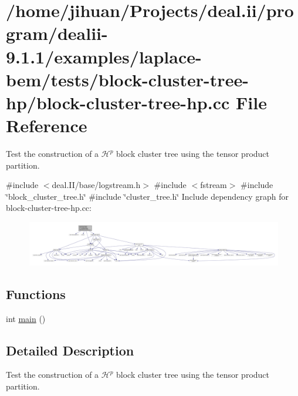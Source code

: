 \hypertarget{block-cluster-tree-hp_8cc}{}\section{/home/jihuan/\+Projects/deal.ii/program/dealii-\/9.1.1/examples/laplace-\/bem/tests/block-\/cluster-\/tree-\/hp/block-\/cluster-\/tree-\/hp.cc File Reference}
\label{block-cluster-tree-hp_8cc}


Test the construction of a $\mathcal{H}^p$ block cluster tree using the tensor product partition.  


{\ttfamily \#include $<$deal.\+I\+I/base/logstream.\+h$>$}\newline
{\ttfamily \#include $<$fstream$>$}\newline
{\ttfamily \#include \char`\"{}block\+\_\+cluster\+\_\+tree.\+h\char`\"{}}\newline
{\ttfamily \#include \char`\"{}cluster\+\_\+tree.\+h\char`\"{}}\newline
Include dependency graph for block-\/cluster-\/tree-\/hp.cc\+:
\nopagebreak
\begin{figure}[H]
\begin{center}
\leavevmode
\includegraphics[width=350pt]{block-cluster-tree-hp_8cc__incl}
\end{center}
\end{figure}
\subsection*{Functions}
\begin{DoxyCompactItemize}
\item 
int \hyperlink{block-cluster-tree-hp_8cc_ae66f6b31b5ad750f1fe042a706a4e3d4}{main} ()
\end{DoxyCompactItemize}


\subsection{Detailed Description}
Test the construction of a $\mathcal{H}^p$ block cluster tree using the tensor product partition. 

